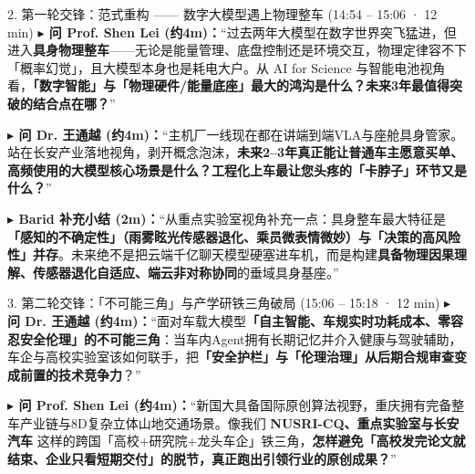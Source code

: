 \documentclass[12pt,a4paper]{article}
\begin{document}
\begin{qabox}{2. 第一轮交锋：范式重构 —— 数字大模型遇上物理整车 (14:54 – 15:06 · 12 min)}
\fontsize{10.5}{14.9}\selectfont
\textbf{$\blacktriangleright$ 问 Prof. Shen Lei (约4m)：}“过去两年大模型在数字世界突飞猛进，但进入\textbf{具身物理整车}——无论是能量管理、底盘控制还是环境交互，物理定律容不下「概率幻觉」，且大模型本身也是耗电大户。从 AI for Science 与智能电池视角看，\textbf{「数字智能」与「物理硬件/能量底座」最大的鸿沟是什么？未来3年最值得突破的结合点在哪？}”\par
\vspace{0.8mm}
\textbf{$\blacktriangleright$ 问 Dr. 王通越 (约4m)：}“主机厂一线现在都在讲端到端VLA与座舱具身管家。站在长安产业落地视角，剥开概念泡沫，\textbf{未来2–3年真正能让普通车主愿意买单、高频使用的大模型核心场景是什么？工程化上车最让您头疼的「卡脖子」环节又是什么？}”\par
\vspace{0.8mm}
\textbf{$\blacktriangleright$ Barid 补充小结 (2m)：}“从重点实验室视角补充一点：具身整车最大特征是\textbf{「感知的不确定性」（雨雾眩光传感器退化、乘员微表情微妙）与「决策的高风险性」并存}。未来绝不是把云端千亿聊天模型硬塞进车机，而是构建\textbf{具备物理因果理解、传感器退化自适应、端云非对称协同}的垂域具身基座。”
\end{qabox}

\begin{qabox}{3. 第二轮交锋：「不可能三角」与产学研铁三角破局 (15:06 – 15:18 · 12 min)}
\fontsize{10.5}{14.9}\selectfont
\textbf{$\blacktriangleright$ 问 Dr. 王通越 (约4m)：}“面对车载大模型\textbf{「自主智能、车规实时功耗成本、零容忍安全伦理」的不可能三角}：当车内Agent拥有长期记忆并介入健康与驾驶辅助，车企与高校实验室该如何联手，把\textbf{「安全护栏」与「伦理治理」从后期合规审查变成前置的技术竞争力}？”\par
\vspace{0.8mm}
\textbf{$\blacktriangleright$ 问 Prof. Shen Lei (约4m)：}“新国大具备国际原创算法视野，重庆拥有完备整车产业链与8D复杂立体山地交通场景。像我们 \textbf{NUSRI-CQ、重点实验室与长安汽车} 这样的跨国「高校+研究院+龙头车企」铁三角，\textbf{怎样避免「高校发完论文就结束、企业只看短期交付」的脱节，真正跑出引领行业的原创成果？}”
\end{qabox}
\end{document}
